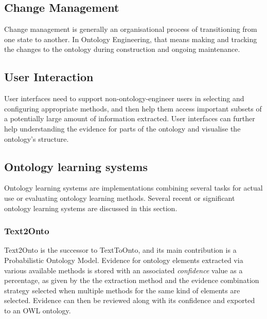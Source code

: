 \documentclass[a4paper]{report}
\newcommand{\todo}[1]{}
\begin{document}
\todo{possibly write about matching up labels for \(c_{rel}\), e.g. OntoCmaps gold was derived from ontocmaps+expert; Hjelm's labels came from the gold standard to start with}
\todo{possibly write about Hjelm and DellschaftStaab06 using term referring to concept and concept interchangeably for sake of simplicity since that's what we're doing too, but might be redundant if we add it in sec:background:ontologies.}

\subsection{Change Management}

Change management is generally an organisational process of transitioning from one state to another.
In Ontology Engineering, that means making and tracking the changes to the ontology during construction and ongoing maintenance.

\subsection{User Interaction}
\label{subsec:background:ui}

User interfaces need to support non-ontology-engineer users in selecting and configuring appropriate methods, and then help them access important subsets of a potentially large amount of information extracted.
User interfaces can further help understanding the evidence for parts of the ontology and visualise the ontology's structure.

\subsection{Ontology learning systems}

Ontology learning systems are implementations combining several tasks for actual use or evaluating ontology learning methods. Several recent or significant ontology learning systems are discussed in this section.

\subsubsection{Text2Onto}

Text2Onto is the successor to TextToOnto, and its main contribution is a Probabilistic Ontology Model.
Evidence for ontology elements extracted via various available methods is stored with an associated \emph{confidence} value as a percentage, as given by the the extraction method and the evidence combination strategy selected when multiple methods for the same kind of elements are selected.
Evidence can then be reviewed along with its confidence and exported to an OWL ontology.
\end{document}
